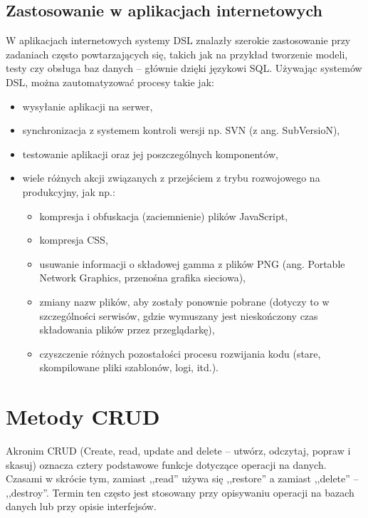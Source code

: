 \documentclass[a4paper,12pt,oneside]{report}
\begin{document}
\subsection{Zastosowanie w aplikacjach internetowych}
\label{dsl:web}
W aplikacjach internetowych systemy DSL znalazły szerokie zastosowanie przy zadaniach często powtarzających się, takich jak na przykład tworzenie modeli, testy czy obsługa baz danych -- głównie dzięki językowi SQL. Używając systemów DSL, można zautomatyzować procesy takie jak:
\begin{itemize}
  \item wysyłanie aplikacji na serwer,
  \item synchronizacja z systemem kontroli wersji np. SVN (z ang. SubVersioN),
  \item testowanie aplikacji oraz jej poszczególnych komponentów,
  \item wiele różnych akcji związanych z przejściem z trybu rozwojowego na produkcyjny, jak np.:
  \begin{itemize}
    \item kompresja i obfuskacja (zaciemnienie) plików JavaScript,
    \item kompresja CSS,
    \item usuwanie informacji o składowej gamma z plików PNG (ang. Portable Network Graphics, przenośna grafika sieciowa),
    \item zmiany nazw plików, aby zostały ponownie pobrane (dotyczy to w szczególności serwisów, gdzie wymuszany jest nieskończony czas składowania plików przez przeglądarkę),
    \item czyszczenie różnych pozostałości procesu rozwijania kodu (stare, skompilowane pliki szablonów, logi, itd.).
  \end{itemize}
\end{itemize}

\section{Metody CRUD}
\label{sec:crud}
Akronim CRUD (Create, read, update and delete -- utwórz, odczytaj, popraw i skasuj) oznacza cztery podstawowe funkcje dotyczące operacji na danych. Czasami w skrócie tym, zamiast ,,read'' używa się ,,restore'' a zamiast ,,delete'' -- ,,destroy''. Termin ten często jest stosowany przy opisywaniu operacji na bazach danych lub przy opisie interfejsów.
\end{document}
